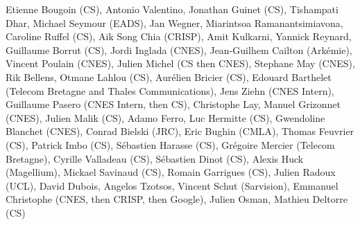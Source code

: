 Etienne Bougoin (CS), Antonio Valentino, Jonathan Guinet (CS), Tishampati Dhar, Michael Seymour (EADS), Jan Wegner, Miarintsoa Ramanantsimiavona, Caroline Ruffel (CS), Aik Song Chia (CRISP), Amit Kulkarni, Yannick Reynard, Guillaume Borrut (CS), Jordi Inglada (CNES), Jean-Guilhem Cailton (Ark\'emie), Vincent Poulain (CNES), Julien Michel (CS then CNES), Stephane May (CNES), Rik Bellens, Otmane Lahlou (CS), Aur\'elien Bricier (CS), Edouard Barthelet (Telecom Bretagne and Thales Communications), Jens Ziehn (CNES Intern), Guillaume Pasero (CNES Intern, then CS), Christophe Lay, Manuel Grizonnet (CNES), Julien Malik (CS), Adamo Ferro, Luc Hermitte (CS), Gwendoline Blanchet (CNES), Conrad Bielski (JRC), Eric Bughin (CMLA), Thomas Feuvrier (CS), Patrick Imbo (CS), S\'ebastien Harasse (CS), Gr\'egoire Mercier (Telecom Bretagne), Cyrille Valladeau (CS), S\'ebastien Dinot (CS), Alexis Huck (Magellium), Mickael Savinaud (CS), Romain Garrigues (CS), Julien Radoux (UCL), David Dubois, Angelos Tzotsos, Vincent Schut (Sarvision), Emmanuel Christophe (CNES, then CRISP, then Google), Julien Osman, Mathieu Deltorre (CS)